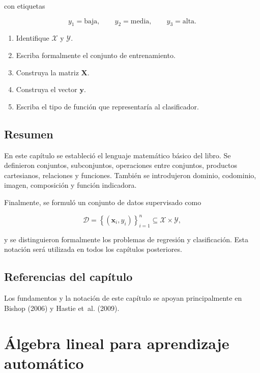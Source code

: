 \documentclass[
  spanish,
  10.5pt,
  letterpaper,
  DIV=11,
  numbers=noendperiod,
  oneside,
  open=any]{scrreprt}
\providecommand{\tightlist}{%
  \setlength{\itemsep}{0pt}\setlength{\parskip}{0pt}}
\theoremstyle{definition}
\theoremstyle{definition}
\theoremstyle{plain}
\theoremstyle{remark}
\begin{document}
con etiquetas

\[
y_1=\text{baja},
\qquad
y_2=\text{media},
\qquad
y_3=\text{alta}.
\]

\begin{enumerate}
\def\labelenumi{\arabic{enumi}.}
\tightlist
\item
  Identifique \(\mathcal{X}\) y \(\mathcal{Y}\).
\item
  Escriba formalmente el conjunto de entrenamiento.
\item
  Construya la matriz \(\mathbf{X}\).
\item
  Construya el vector \(\mathbf{y}\).
\item
  Escriba el tipo de función que representaría al clasificador.
\end{enumerate}

\section*{Resumen}\label{resumen}


En este capítulo se estableció el lenguaje matemático básico del libro.
Se definieron conjuntos, subconjuntos, operaciones entre conjuntos,
productos cartesianos, relaciones y funciones. También se introdujeron
dominio, codominio, imagen, composición y función indicadora.

Finalmente, se formuló un conjunto de datos supervisado como

\[
\mathcal{D}
=
\left\{
(\mathbf{x}_i,y_i)
\right\}_{i=1}^{n}
\subseteq
\mathcal{X}\times\mathcal{Y},
\]

y se distinguieron formalmente los problemas de regresión y
clasificación. Esta notación será utilizada en todos los capítulos
posteriores.

\section*{Referencias del capítulo}\label{referencias-del-capuxedtulo}


Los fundamentos y la notación de este capítulo se apoyan principalmente
en Bishop (2006) y Hastie et~al. (2009).

\chapter{Álgebra lineal para aprendizaje
automático}\label{sec-algebra-lineal}
\end{document}

